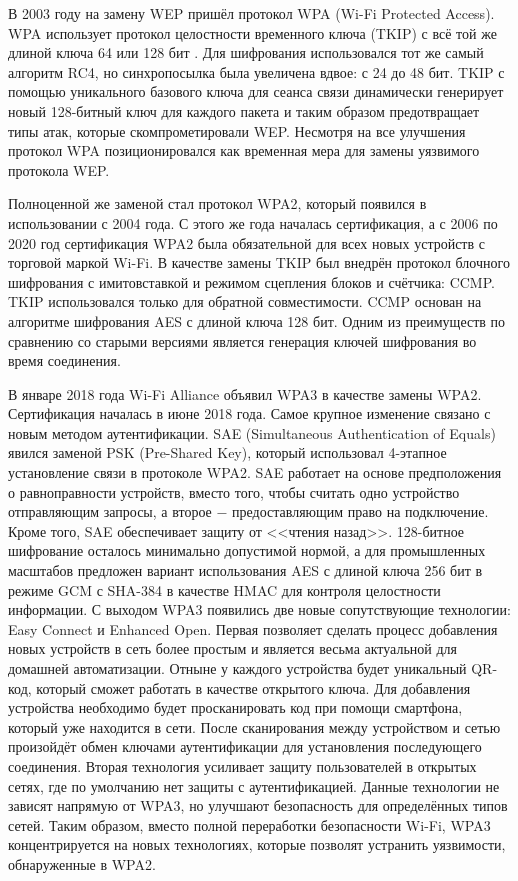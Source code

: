 	В 2003 году на замену WEP пришёл протокол WPA (Wi-Fi Protected Access). WPA использует протокол 
	целостности временного ключа (TKIP) с всё той же длиной ключа 64 или 128 бит \cite{802.11i-2004}. Для шифрования
	использовался тот же самый алгоритм RC4, но синхропосылка была увеличена вдвое: с 24 до 48 бит.
	TKIP с помощью уникального базового ключа для сеанса связи динамически генерирует новый 128-битный ключ для 
	каждого пакета и таким образом предотвращает типы атак, которые скомпрометировали WEP. Несмотря
	на все улучшения протокол WPA позиционировался как временная мера для замены уязвимого протокола
	WEP.
	
	Полноценной же заменой стал протокол WPA2, который появился в использовании с 2004 года. С этого
	же года началась сертификация, а с 2006 по 2020 год сертификация WPA2 была обязательной для всех
	новых устройств с торговой маркой Wi-Fi. В качестве замены TKIP был внедрён протокол блочного 
	шифрования с имитовставкой и режимом сцепления блоков и счётчика: CCMP. TKIP использовался
	только для обратной совместимости. CCMP основан на алгоритме шифрования AES с длиной ключа 128 бит.
	Одним из преимуществ по сравнению со старыми версиями является генерация ключей шифрования во время
	соединения.
	
	В январе 2018 года Wi-Fi Alliance объявил WPA3 в качестве замены WPA2. Сертификация началась в июне 
	2018 года. Самое крупное изменение связано с новым методом аутентификации. SAE (Simultaneous 
	Authentication of Equals) явился заменой PSK (Pre-Shared Key), который использовал 4-этапное 
	установление связи в протоколе WPA2. SAE работает на основе предположения о равноправности 
	устройств, вместо того, чтобы считать одно устройство отправляющим запросы, а второе $-$ предоставляющим 
	право на подключение.  Кроме того, SAE обеспечивает защиту от <<чтения назад>>. 128-битное шифрование
	осталось минимально допустимой нормой, а для промышленных масштабов предложен вариант использования
	AES с длиной ключа 256 бит в режиме GCM с SHA-384 в качестве HMAC для контроля целостности информации.
	С выходом WPA3 появились две новые сопутствующие технологии: Easy Connect  и Enhanced Open. Первая
	позволяет сделать процесс добавления новых устройств в сеть более простым и является весьма актуальной
	для домашней автоматизации. Отныне у каждого устройства будет уникальный QR-код, который сможет
	работать в качестве открытого ключа. Для добавления устройства необходимо будет просканировать код 
	при помощи смартфона, который уже находится в сети. После сканирования между устройством и сетью 
	произойдёт обмен ключами аутентификации для установления последующего соединения.
	Вторая технология усиливает защиту пользователей в открытых сетях, где по умолчанию нет защиты с
	аутентификацией.
	Данные технологии не зависят напрямую от WPA3, но улучшают безопасность для определённых типов сетей.
	Таким образом, вместо полной переработки безопасности Wi-Fi, WPA3 концентрируется на новых технологиях, 
	которые позволят устранить уязвимости, обнаруженные в WPA2.
	
